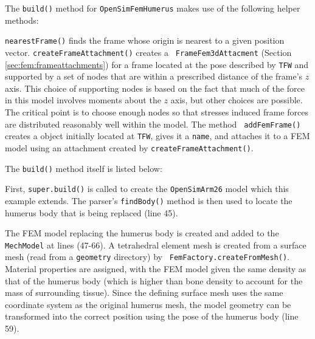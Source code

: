 The {\tt build()} method for {\tt OpenSimFemHumerus} makes use of the following
helper methods:
%
\lstset{numbers=left} 
\iflatexml

\else
{}

\fi
\lstset{numbers=none}

{\tt nearestFrame()} finds the frame whose origin is nearest to a given
position vector. {\tt createFrameAttachment()} creates a {\tt
FrameFem3dAttacment} (Section \ref{sec:fem:frameattachments}) for a frame
located at the pose described by {\tt TFW} and supported by a set of nodes that
are within a prescribed distance of the frame's $z$ axis.  This choice of
supporting nodes is based on the fact that much of the force in this model
involves moments about the $z$ axis, but other choices are possible.  The
critical point is to choose enough nodes so that stresses induced frame forces
are distributed reasonably well within the model. The method {\tt
addFemFrame()} creates a  object initially located at
{\tt TFW}, gives it a {\tt name}, and attaches it to a FEM model using an
attachment created by {\tt createFrameAttachment()}.

The {\tt build()} method itself is listed below:
%
\lstset{numbers=left} 
\iflatexml

\else
{}

\fi
\lstset{numbers=none}
%
First, {\tt super.build()} is called to create the {\tt OpenSimArm26} model
which this example extends. The parser's {\tt findBody()} method is then used
to locate the humerus body that is being replaced (line 45).

The FEM model replacing the humerus body is created and added to the {\tt
MechModel} at lines (47-66). A tetrahedral element mesh is created from a
surface mesh (read from a {\tt geometry} directory) by {\tt
FemFactory.createFromMesh()}. Material properties are assigned, with the FEM
model given the same density as that of the humerus body (which is higher than
bone density to account for the mass of surrounding tissue). Since the defining
surface mesh uses the same coordinate system as the original humerus mesh, the
model geometry can be transformed into the correct position using the pose of
the humerus body (line 59).

